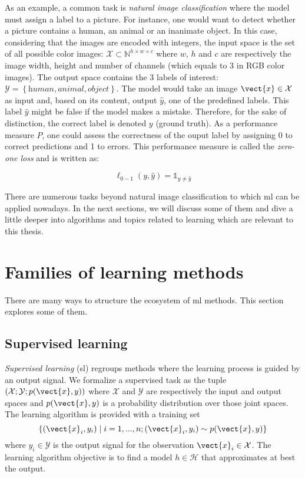As an example, a common task is \textit{natural image classification} where the model must assign a label to a picture. For instance, one would want to detect whether a picture contains a human, an animal or an inanimate object. In this case, considering that the images are encoded with integers, the input space is the set of all possible color images: $\mathcal{X} \subset \mathbb{N}^{h\times w\times c}$ where $w$, $h$ and $c$ are respectively the image width, height and number of channels (which equals to 3 in RGB color images). The output space contains the 3 labels of interest: $\mathcal{Y} = \left\{\textit{human}, \textit{animal}, \textit{object}\right\}$. The model would take an image $\vect{x} \in \mathcal{X}$ as input and, based on its content, output $\hat{y}$, one of the predefined labels. This label $\hat{y}$ might be false if the model makes a mistake. Therefore, for the sake of distinction, the correct label is denoted $y$ (\aka ground truth). As a performance measure $P$, one could assess the correctness of the ouput label by assigning 0 to correct predictions and 1 to errors. This performance measure is called the \textit{zero-one loss} and is written as:

\begin{equation}
\ell_{0-1}(y, \hat{y}) = \mathbb{1}_{y\neq\hat{y}}
\end{equation}

There are numerous tasks beyond natural image classification to which \acrlong{ml} can be applied nowadays. In the next sections, we will discuss some of them and dive a little deeper into algorithms and topics related to learning which are relevant to this thesis.


\section{Families of learning methods}
\label{sec:backml:families}

There are many ways to structure the ecosystem of \acrlong{ml} methods. This section explores some of them.

\subsection{Supervised learning}
\label{ssec:backml:sl}

\textit{Supervised learning} (\acrshort{sl}) regroups methods where the learning process is guided by an output signal. We formalize a supervised task as the tuple $\left(\mathcal{X}; \mathcal{Y}; p(\vect{x}, y)\right)$ where $\mathcal{X}$ and $\mathcal{Y}$ are respectively the input and output spaces and $p(\vect{x}, y)$ is a probability distribution over those joint spaces. The learning algorithm is provided with a training set 
\begin{equation}
\label{eqn:backml:supervised}
\left\{(\vect{x}_i, y_i) \mid i = 1,...,n ; (\vect{x}_i, y_i) \sim p(\vect{x}, y) \right\}
\end{equation}
where $y_i \in \mathcal{Y}$ is the output signal for the observation $\vect{x}_i \in \mathcal{X}$. The learning algorithm objective is to find a model $h \in \mathcal{H}$ that approximates at best the output. 

